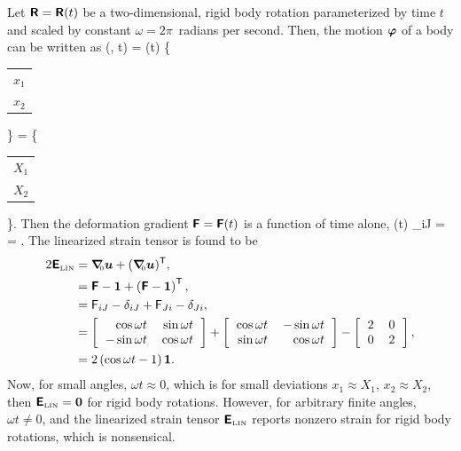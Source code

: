 Let $\mbox{\sffamily\bfseries R} = \mbox{\sffamily\bfseries R}(t)$ be a two-dimensional, 
rigid body rotation parameterized by time $t$
and scaled by constant $\omega = 2 \pi$~radians per second.  
Then, the motion $\mbox{\boldmath $\varphi$}$ of a body can be written as
\be
 \vvarphi(\vX, t) = \tRbold(t) \vX 
 \;\; \Longleftrightarrow \;\;
 \left\{
 \begin{tabular}{c}
 $x_1$ \\
 $x_2$
 \end{tabular}
 \right\}
 = 
 \left\{
 \begin{tabular}{c}
 $X_1$ \\
 $X_2$
 \end{tabular}
 \right\}.
\ee
Then the deformation gradient $\mbox{\sffamily\bfseries F} = \mbox{\sffamily\bfseries F}(t)$ is a function of time
alone,
\be
 \tFbold(t)
 \;\; \Longleftrightarrow \;\;
 \tF_{iJ} 
 = 
 \left[
 \begin{tabular}{rr}
 $\tF_{11}$ & $\tF_{12}$ \\
 $\tF_{21}$ & $\tF_{22}$ 
 \end{tabular}
 \right]
 =
 .
\ee
The linearized strain tensor is found to be 
\begin{align}
 2 \tEbold_{\tiny \mbox{LIN}}
 &= \Grad \vu + (\Grad \vu)\transpose, \\
 &= \tFbold - \vid + 
     \left(\tFbold - \vid \right)\transpose, \\
 &= \tF_{iJ} - \delta_{iJ} + \tF_{Ji} - \delta_{Ji}, \\ 
 &= 
 \left[
 \begin{tabular}{rr}
 $\cos \omega t$ & $\sin \omega t$ \\
 $-\sin \omega t$ & $\cos \omega t$ 
 \end{tabular}
 \right]
 +   
 \left[
 \begin{tabular}{rr}
 $\cos \omega t$ & $-\sin \omega t$ \\
 $\sin \omega t$ & $\cos \omega t$ 
 \end{tabular}
 \right]
 -   
 \left[
 \begin{tabular}{rr}
 $2$ & $0$ \\
 $0$ & $2$ 
 \end{tabular}
 \right], \\
 &=
 2 \left( \cos \omega t - 1 \right) \vid.
\end{align}
Now, for small angles, $\omega t \approx 0$, which is
for small deviations $x_1 \approx X_1$, $x_2 \approx X_2$, then
$\mbox{\sffamily\bfseries E}_{\tiny \mbox{LIN}} = \mbox{\boldmath $0$}$ for rigid body rotations.
However, for arbitrary finite angles, $\omega t \neq 0$,
and the linearized strain tensor
$\mbox{\sffamily\bfseries E}_{\tiny \mbox{LIN}}$ reports nonzero strain for rigid
body rotations, which is nonsensical.

